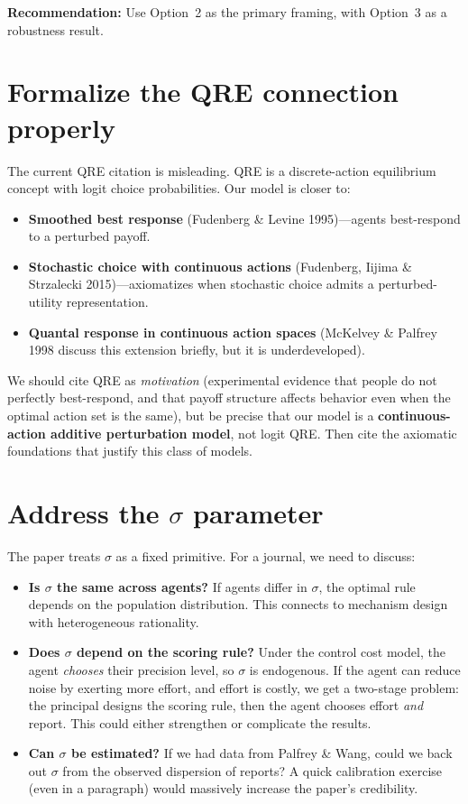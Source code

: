 \documentclass[11pt]{article}
\begin{document}
\medskip
\noindent\textbf{Recommendation:} Use Option~2 as the primary framing, with Option~3 as a robustness result.

\section{Formalize the QRE connection properly}

The current QRE citation is misleading. QRE is a discrete-action equilibrium concept with logit choice probabilities. Our model is closer to:
\begin{itemize}
\item \textbf{Smoothed best response} (Fudenberg \& Levine 1995)---agents best-respond to a perturbed payoff.
\item \textbf{Stochastic choice with continuous actions} (Fudenberg, Iijima \& Strzalecki 2015)---axiomatizes when stochastic choice admits a perturbed-utility representation.
\item \textbf{Quantal response in continuous action spaces} (McKelvey \& Palfrey 1998 discuss this extension briefly, but it is underdeveloped).
\end{itemize}

We should cite QRE as \emph{motivation} (experimental evidence that people do not perfectly best-respond, and that payoff structure affects behavior even when the optimal action set is the same), but be precise that our model is a \textbf{continuous-action additive perturbation model}, not logit QRE. Then cite the axiomatic foundations that justify this class of models.

\section{Address the $\sigma$ parameter}

The paper treats $\sigma$ as a fixed primitive. For a journal, we need to discuss:

\begin{itemize}
\item \textbf{Is $\sigma$ the same across agents?} If agents differ in $\sigma$, the optimal rule depends on the population distribution. This connects to mechanism design with heterogeneous rationality.
\item \textbf{Does $\sigma$ depend on the scoring rule?} Under the control cost model, the agent \emph{chooses} their precision level, so $\sigma$ is endogenous. If the agent can reduce noise by exerting more effort, and effort is costly, we get a two-stage problem: the principal designs the scoring rule, then the agent chooses effort \emph{and} report. This could either strengthen or complicate the results.
\item \textbf{Can $\sigma$ be estimated?} If we had data from Palfrey \& Wang, could we back out $\sigma$ from the observed dispersion of reports? A quick calibration exercise (even in a paragraph) would massively increase the paper's credibility.
\end{itemize}
\end{document}
